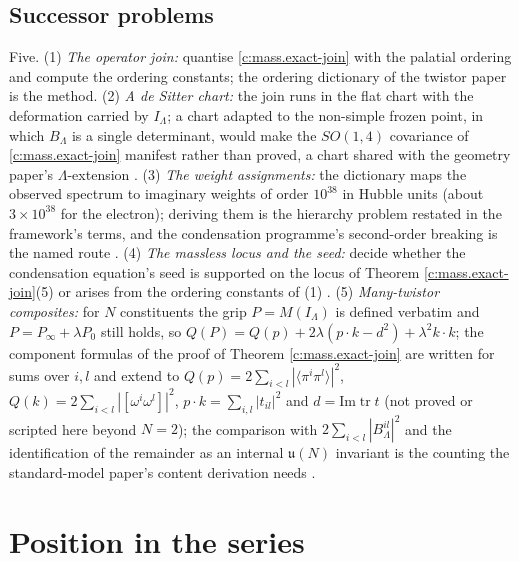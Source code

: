 \documentclass[11pt]{article}
\theoremstyle{definition}
\theoremstyle{plain}
\providecommand{\tr}{}\renewcommand{\tr}{\operatorname{tr}}
\providecommand{\br}{}\renewcommand{\br}[1]{\langle #1\rangle}
\begin{document}
\subsection*{Successor problems}
\label{c:note.mass.setting-successor-problems}
Five. (1) \emph{The operator join:} quantise \ref{c:mass.exact-join} with the palatial ordering and compute the ordering constants; the ordering dictionary of the twistor paper is the method. (2) \emph{A de Sitter chart:} the join runs in the flat chart with the deformation carried by $I_{\Lambda}$; a chart adapted to the non-simple frozen point, in which $B_{\Lambda}$ is a single determinant, would make the $SO(1,4)$ covariance of \ref{c:mass.exact-join} manifest rather than proved, a chart shared with the geometry paper's $\Lambda$-extension \cite{ButlerT6}. (3) \emph{The weight assignments:} the dictionary maps the observed spectrum to imaginary weights of order $10^{38}$ in Hubble units (about $3 \times 10^{38}$ for the electron); deriving them is the hierarchy problem restated in the framework's terms, and the condensation programme's second-order breaking is the named route \cite{ButlerT13}. (4) \emph{The massless locus and the seed:} decide whether the condensation equation's seed is supported on the locus of Theorem \ref{c:mass.exact-join}(5) or arises from the ordering constants of (1) \cite{ButlerT13}. (5) \emph{Many-twistor composites:} for $N$ constituents the grip $P = M(I_{\Lambda})$ is defined verbatim and $P = P_{\infty} + \lambda P_{0}$ still holds, so $Q(P) = Q(p) + 2\lambda(p\cdot k - d^{2}) + \lambda^{2}k\cdot k$; the component formulas of the proof of Theorem \ref{c:mass.exact-join} are written for sums over $i, l$ and extend to $Q(p) = 2\sum_{i<l}|\br{\pi^{i}\pi^{l}}|^{2}$, $Q(k) = 2\sum_{i<l}|[\omega^{i}\omega^{l}]|^{2}$, $p\cdot k = \sum_{i,l}|t_{il}|^{2}$ and $d = \mathrm{Im}\tr t$ (not proved or scripted here beyond $N = 2$); the comparison with $2\sum_{i<l}|B^{il}_{\Lambda}|^{2}$ and the identification of the remainder as an internal $\mathfrak{u}(N)$ invariant is the counting the standard-model paper's content derivation needs \cite{ButlerT12}.

\section{Position in the series}
\end{document}
